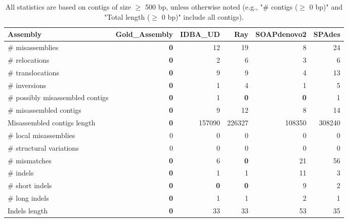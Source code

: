\documentclass[12pt,a4paper]{article}
\begin{document}
\begin{table}[ht]
\begin{center}
\caption{All statistics are based on contigs of size $\geq$ 500 bp, unless otherwise noted (e.g., "\# contigs ($\geq$ 0 bp)" and "Total length ($\geq$ 0 bp)" include all contigs).}
\begin{tabular}{|l*{5}{|r}|}
\hline
Assembly & Gold\_Assembly & IDBA\_UD & Ray & SOAPdenovo2 & SPAdes \\ \hline
\# misassemblies & {\bf 0} & 12 & 19 & 8 & 24 \\ \hline
\hspace{5mm}\# relocations & {\bf 0} & 2 & 6 & 3 & 6 \\ \hline
\hspace{5mm}\# translocations & {\bf 0} & 9 & 9 & 4 & 13 \\ \hline
\hspace{5mm}\# inversions & {\bf 0} & 1 & 4 & 1 & 5 \\ \hline
\# possibly misassembled contigs & {\bf 0} & 1 & {\bf 0} & {\bf 0} & 1 \\ \hline
\# misassembled contigs & {\bf 0} & 9 & 12 & 8 & 14 \\ \hline
Misassembled contigs length & {\bf 0} & 157090 & 226327 & 108350 & 308240 \\ \hline
\# local misassemblies & 0 & 0 & 0 & 0 & 0 \\ \hline
\# structural variations & 0 & 0 & 0 & 0 & 0 \\ \hline
\# mismatches & {\bf 0} & 6 & {\bf 0} & 21 & 56 \\ \hline
\# indels & {\bf 0} & 1 & 1 & 11 & 3 \\ \hline
\hspace{5mm}\# short indels & {\bf 0} & {\bf 0} & {\bf 0} & 9 & 2 \\ \hline
\hspace{5mm}\# long indels & {\bf 0} & 1 & 1 & 2 & 1 \\ \hline
Indels length & {\bf 0} & 33 & 33 & 53 & 35 \\ \hline
\end{tabular}
\end{center}
\end{table}
\end{document}

